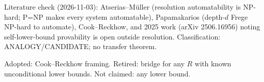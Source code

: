 \documentclass{article}
\begin{document}
Literature check (2026-11-03): Atserias--M\"uller (resolution automatability is NP-hard; P=NP makes every system automatable), Papamakarios (depth-$d$ Frege NP-hard to automate), Cook--Reckhow, and 2025 work (arXiv 2506.16956) noting self-lower-bound provability is open outside resolution. Classification: ANALOGY/CANDIDATE; no transfer theorem.

Adopted: Cook--Reckhow framing. Retired: bridge for any $R$ with known unconditional lower bounds. Not claimed: any lower bound.
\end{document}
